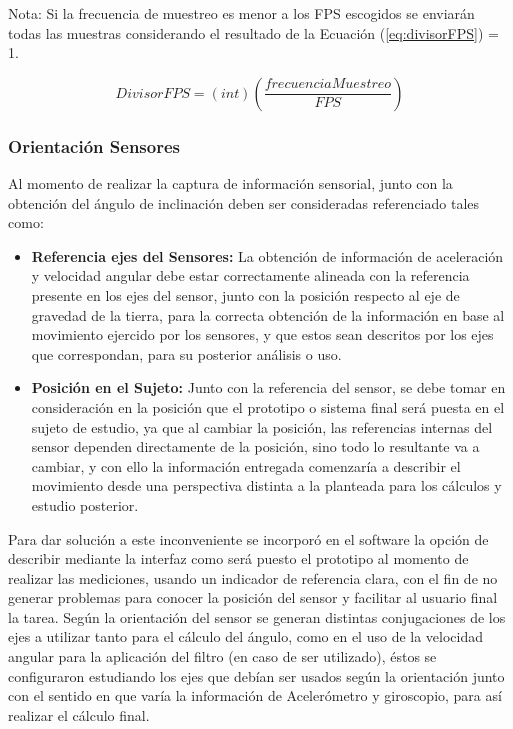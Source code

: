 \documentclass[12pt,a4paper]{article}
\begin{document}
Nota: Si la frecuencia de muestreo es menor a los FPS escogidos se enviarán todas las muestras considerando el resultado de la Ecuación (\ref{eq:divisorFPS}) = 1.

\begin{equation}
\label{eq:divisorFPS}
DivisorFPS=(int)\left(\frac{frecuenciaMuestreo}{FPS}\right)
\end{equation}

\subsubsection{Orientación Sensores}
Al momento de realizar la captura de información sensorial, junto con la obtención del ángulo de inclinación deben ser consideradas referenciado tales como:
\begin{itemize}
	
	\item \textbf{Referencia ejes del Sensores:} La obtención de información de aceleración y velocidad angular debe estar correctamente alineada con la referencia presente en los ejes del sensor, junto con la posición respecto al eje de gravedad de la tierra, para la correcta obtención de la información en base al movimiento ejercido por los sensores, y que estos sean descritos por los ejes que correspondan, para su posterior análisis o uso.
	
	\item \textbf{Posición en el Sujeto:} Junto con la referencia del sensor, se debe tomar en consideración en la posición que el prototipo o sistema final será puesta en el sujeto de estudio, ya que al cambiar la posición, las referencias internas del sensor dependen directamente de la posición, sino todo lo resultante va a cambiar, y con ello la información entregada comenzaría a describir el movimiento desde una perspectiva distinta a la planteada para los cálculos y estudio posterior.
\end{itemize}

Para dar solución a este inconveniente se incorporó en el software la opción de describir mediante la interfaz como será puesto el prototipo al momento de realizar las mediciones, usando un indicador de referencia clara, con el fin de no generar problemas para conocer la posición del sensor y facilitar al usuario final la tarea.
Según la orientación del sensor se generan distintas conjugaciones de los ejes a utilizar tanto para el cálculo del ángulo, como en el uso de la velocidad angular para la aplicación del filtro (en caso de ser utilizado), éstos se configuraron estudiando los ejes que debían ser usados según la orientación junto con el sentido en que varía la información de Acelerómetro y giroscopio, para así realizar el cálculo final.
\end{document}

